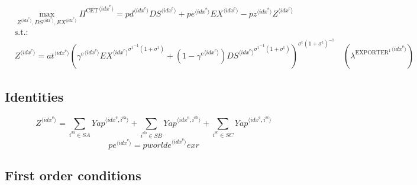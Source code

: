 \begin{align}
&\max_{{Z}^{\langle {i\!d\!x}^{\mathrm{e}}\rangle}, {{D\!S}}^{\langle {i\!d\!x}^{\mathrm{e}}\rangle}, {{E\!X}}^{\langle {i\!d\!x}^{\mathrm{e}}\rangle}
} {\Pi^{\mathrm{CET}}}^{\langle {i\!d\!x}^{\mathrm{e}}\rangle} = {{{p\!d}}^{\langle {i\!d\!x}^{\mathrm{e}}\rangle}} {{{D\!S}}^{\langle {i\!d\!x}^{\mathrm{e}}\rangle}} + {{{p\!e}}^{\langle {i\!d\!x}^{\mathrm{e}}\rangle}} {{{E\!X}}^{\langle {i\!d\!x}^{\mathrm{e}}\rangle}} - {{{p\!z}}^{\langle {i\!d\!x}^{\mathrm{e}}\rangle}} {{Z}^{\langle {i\!d\!x}^{\mathrm{e}}\rangle}}\\
&\mathrm{s.t.:}\nonumber\\
& {Z}^{\langle {i\!d\!x}^{\mathrm{e}}\rangle} = {{{a\!t}}^{\langle {i\!d\!x}^{\mathrm{e}}\rangle}} {\left({{\gamma^{\mathrm{e}}}^{\langle {i\!d\!x}^{\mathrm{e}}\rangle}} {{{{E\!X}}^{\langle {i\!d\!x}^{\mathrm{e}}\rangle}}^{{\sigma^{\mathrm{t}}}^{-1} \left(1 + \sigma^{\mathrm{t}}\right)}} + \left(1 - {\gamma^{\mathrm{e}}}^{\langle {i\!d\!x}^{\mathrm{e}}\rangle}\right) {{{{D\!S}}^{\langle {i\!d\!x}^{\mathrm{e}}\rangle}}^{{\sigma^{\mathrm{t}}}^{-1} \left(1 + \sigma^{\mathrm{t}}\right)}}\right)^{{\sigma^{\mathrm{t}}} \left(1 + \sigma^{\mathrm{t}}\right)^{-1}}} \quad \left({\lambda^{\mathrm{EXPORTER}^{\mathrm{1}}}}^{\langle {i\!d\!x}^{\mathrm{e}}\rangle}\right)
\end{align}


\subsection{Identities}

\begin{equation}
{Z}^{\langle {i\!d\!x}^{\mathrm{e}}\rangle} = \sum_{i^{\mathrm{sa}}\in {S\!A}} {{Y\!a\!p}}^{\langle {i\!d\!x}^{\mathrm{e}},i^{\mathrm{sa}}\rangle} + \sum_{i^{\mathrm{sb}}\in {S\!B}} {{Y\!a\!p}}^{\langle {i\!d\!x}^{\mathrm{e}},i^{\mathrm{sb}}\rangle} + \sum_{i^{\mathrm{sc}}\in {S\!C}} {{Y\!a\!p}}^{\langle {i\!d\!x}^{\mathrm{e}},i^{\mathrm{sc}}\rangle}
\end{equation}
\begin{equation}
{{p\!e}}^{\langle {i\!d\!x}^{\mathrm{e}}\rangle} = {{{p\!w\!o\!r\!l\!d\!e}}^{\langle {i\!d\!x}^{\mathrm{e}}\rangle}} {{e\!x\!r}}
\end{equation}


\subsection{First order conditions}

